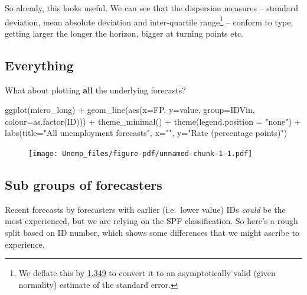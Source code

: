 \documentclass[
  letterpaper,
]{book}
\newenvironment{Shaded}{\begin{snugshade}}{\end{snugshade}}
\newcommand{\AttributeTok}[1]{\textcolor[rgb]{0.40,0.45,0.13}{#1}}
\newcommand{\FunctionTok}[1]{\textcolor[rgb]{0.28,0.35,0.67}{#1}}
\newcommand{\NormalTok}[1]{\textcolor[rgb]{0.00,0.23,0.31}{#1}}
\newcommand{\SpecialCharTok}[1]{\textcolor[rgb]{0.37,0.37,0.37}{#1}}
\newcommand{\StringTok}[1]{\textcolor[rgb]{0.13,0.47,0.30}{#1}}
\begin{document}
So already, this looks useful. We can see that the dispersion measures
-- standard deviation, mean absolute deviation and inter-quartile
range\footnote{We deflate this by
  \href{https://en.wikipedia.org/wiki/Robust_measures_of_scale\#Estimation}{1.349}
  to convert it to an asymptotically valid (given normality) estimate of
  the standard error.} -- conform to type, getting larger the longer the
horizon, bigger at turning points etc.

\hypertarget{everything}{%
\subsection{Everything}\label{everything}}

What about plotting \textbf{all} the underlying forecasts?

\begin{Shaded}
\begin{Highlighting}[]
\FunctionTok{ggplot}\NormalTok{(micro\_long) }\SpecialCharTok{+} 
  \FunctionTok{geom\_line}\NormalTok{(}\FunctionTok{aes}\NormalTok{(}\AttributeTok{x=}\NormalTok{FP, }\AttributeTok{y=}\NormalTok{value, }\AttributeTok{group=}\NormalTok{IDVin, }\AttributeTok{colour=}\FunctionTok{as.factor}\NormalTok{(ID))) }\SpecialCharTok{+}
  \FunctionTok{theme\_minimal}\NormalTok{() }\SpecialCharTok{+}
  \FunctionTok{theme}\NormalTok{(}\AttributeTok{legend.position =} \StringTok{"none"}\NormalTok{) }\SpecialCharTok{+}
  \FunctionTok{labs}\NormalTok{(}\AttributeTok{title=}\StringTok{"All unemployment forecasts"}\NormalTok{, }\AttributeTok{x=}\StringTok{""}\NormalTok{, }\AttributeTok{y=}\StringTok{"Rate (percentage points)"}\NormalTok{)}
\end{Highlighting}
\end{Shaded}

\begin{figure}[H]

{\centering \texttt{[image: Unemp\_files/figure-pdf/unnamed-chunk-1-1.pdf]}

}

\end{figure}

\hypertarget{sub-groups-of-forecasters}{%
\subsection{Sub groups of forecasters}\label{sub-groups-of-forecasters}}

Recent forecasts by forecasters with earlier (i.e.~lower value) IDs
\emph{could} be the most experienced, but we are relying on the SPF
classification. So here's a rough split based on ID number, which shows
some differences that we might ascribe to experience.
\end{document}
